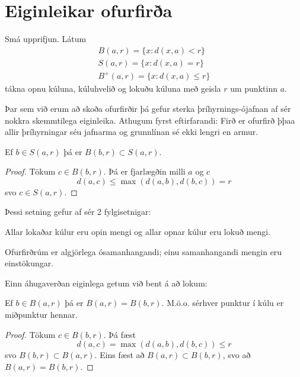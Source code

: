 \section*{Eiginleikar ofurfirða}
\begin{skilgr}
Smá upprifjun. Látum
\begin{align*}
B(a,r) = \{x:d(x,a)<r\} \\
S(a,r) = \{x:d(x,a) = r\} \\
B^+(a,r) = \{x:d(x,a) \leq r\}
\end{align*}
tákna opnu kúluna, kúluhvelið og lokuðu kúluna með geisla $r$ um punktinn $a$.
\end{skilgr}
Þar sem við erum að skoða ofurfirðir þá gefur sterka þríhyrnings-ójafnan af sér nokkra skemmtilega eiginleika.
Athugum fyrst eftirfarandi:
Firð er ofurfirð þþaa allir þríhyrningar séu jafnarma og grunnlínan sé ekki lengri en armur.
\begin{setn}
Ef $b \in S(a,r)$ þá er $B(b,r) \subset S(a,r)$.
\end{setn}
\begin{proof}
Tökum $c \in B(b,r)$. Þá er fjarlægðin milli $a$ og $c$
\begin{equation*}
d(a,c) \leq \max(d(a,b),d(b,c)) = r 
\end{equation*}
svo $c \in S(a,r)$.
\end{proof}
Þessi setning gefur af sér 2 fylgisetnigar:
\begin{fylgisetn}
Allar lokaðar kúlur eru opin mengi og allar opnar kúlur eru lokuð mengi.
\end{fylgisetn}
\begin{fylgisetn} 
Ofurfirðrúm er algjörlega ósamanhangandi; einu samanhangandi mengin eru einstökungar.
\end{fylgisetn}
Einn áhugaverðan eiginlega getum við bent á að lokum:
\begin{setn}
Ef $b\in B(a,r)$ þá er $B(a,r) = B(b,r)$. M.ö.o. sérhver punktur í kúlu er miðpunktur hennar.
\end{setn}
\begin{proof}
Tökum $c\in B(b,r)$. Þá fæst
\begin{equation*}
d(a,c) = \max (d(a,b),d(b,c)) \leq r
\end{equation*}
svo $B(b,r) \subset B(a,r)$. Eins fæst að $B(a,r) \subset B(b,r)$, svo að $B(a,r) = B(b,r)$.
\end{proof}


